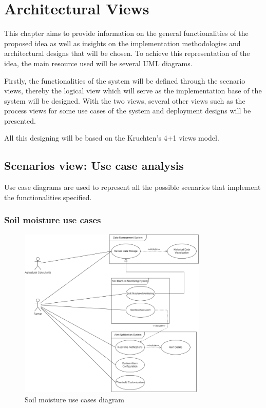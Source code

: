 \section{Architectural Views}
This chapter aims to provide information on the general functionalities of the proposed idea 
as well as insights on the implementation methodologies and architectural designs that will be chosen. 
To achieve this representation of the idea, the main resource used will be several UML diagrams.

Firstly, the functionalities of the system will be defined through the scenario views, thereby the logical 
view which will serve as the implementation base of the system will be designed. 
With the two views, several other views such as the process views for some use cases of the system and 
deployment designs will be presented.

All this designing will be based on the Kruchten’s 4+1 views model\cite{ArchitecturalBlueprints4+1}.

\subsection{Scenarios view: Use case analysis}

Use case diagrams are used to represent all the possible scenarios that implement the functionalities specified.

\subsubsection*{Soil moisture use cases}
\begin{figure}[H]
    \centering
    \includegraphics[width=0.8\textwidth]{./images/6/data_soil_alert_uses.png}
    \caption{Soil moisture use cases diagram}
\end{figure}


